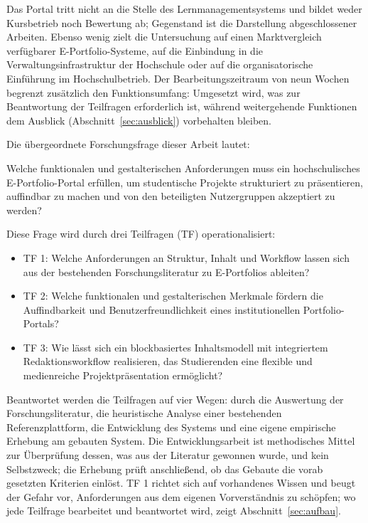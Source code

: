 Das Portal tritt nicht an die Stelle des Lernmanagementsystems und bildet weder Kursbetrieb noch Bewertung ab; Gegenstand ist die Darstellung abgeschlossener Arbeiten. Ebenso wenig zielt die Untersuchung auf einen Marktvergleich verfügbarer E-Portfolio-Systeme, auf die Einbindung in die Verwaltungsinfrastruktur der Hochschule oder auf die organisatorische Einführung im Hochschulbetrieb. Der Bearbeitungszeitraum von neun Wochen begrenzt zusätzlich den Funktionsumfang: Umgesetzt wird, was zur Beantwortung der Teilfragen erforderlich ist, während weitergehende Funktionen dem Ausblick (Abschnitt~\ref{sec:ausblick}) vorbehalten bleiben.

Die übergeordnete Forschungsfrage dieser Arbeit lautet:

Welche funktionalen und gestalterischen Anforderungen muss ein hochschulisches E-Portfolio-Portal erfüllen, um studentische Projekte strukturiert zu präsentieren, auffindbar zu machen und von den beteiligten Nutzergruppen akzeptiert zu werden?

Diese Frage wird durch drei Teilfragen (TF) operationalisiert:

\begin{itemize}[topsep=0.4em, itemsep=0.4em]
	\item TF 1: Welche Anforderungen an Struktur, Inhalt und Workflow lassen sich aus der bestehenden Forschungsliteratur zu E-Portfolios ableiten?
	\item TF 2: Welche funktionalen und gestalterischen Merkmale fördern die Auffindbarkeit und Benutzerfreundlichkeit eines institutionellen Portfolio-Portals?
	\item TF 3: Wie lässt sich ein blockbasiertes Inhaltsmodell mit integriertem Redaktionsworkflow realisieren, das Studierenden eine flexible und medienreiche Projektpräsentation ermöglicht?
\end{itemize}

Beantwortet werden die Teilfragen auf vier Wegen: durch die Auswertung der Forschungsliteratur, die heuristische Analyse einer bestehenden Referenzplattform, die Entwicklung des Systems und eine eigene empirische Erhebung am gebauten System. Die Entwicklungsarbeit ist methodisches Mittel zur Überprüfung dessen, was aus der Literatur gewonnen wurde, und kein Selbstzweck; die Erhebung prüft anschließend, ob das Gebaute die vorab gesetzten Kriterien einlöst. TF 1 richtet sich auf vorhandenes Wissen und beugt der Gefahr vor, Anforderungen aus dem eigenen Vorverständnis zu schöpfen; wo jede Teilfrage bearbeitet und beantwortet wird, zeigt Abschnitt~\ref{sec:aufbau}.

